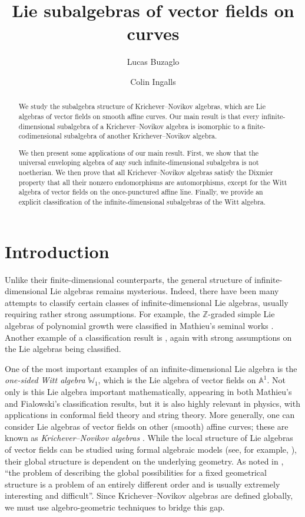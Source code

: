 \documentclass[12pt]{amsart}
\title{Lie subalgebras of vector fields on curves}
\author{Lucas Buzaglo}
\author{Colin Ingalls}
\theoremstyle{plain}
\theoremstyle{definition}
\numberwithin{equation}{section}
\def\ZZ{\mathbb{Z}}
\def\Aa{\mathbb{A}}
\def\WW{\mathbb{W}}
\begin{document}
\begin{abstract}
    We study the subalgebra structure of Krichever--Novikov algebras, which are Lie algebras of vector fields on smooth affine curves. Our main result is that every infinite-dimensional subalgebra of a Krichever--Novikov algebra is isomorphic to a finite-codimensional subalgebra of another Krichever--Novikov algebra.
    
    We then present some applications of our main result. First, we show that the universal enveloping algebra of any such infinite-dimensional subalgebra is not noetherian. We then prove that all Krichever--Novikov algebras satisfy the Dixmier property that all their nonzero endomorphisms are automorphisms, except for the Witt algebra of vector fields on the once-punctured affine line. Finally, we provide an explicit classification of the infinite-dimensional subalgebras of the Witt algebra.
\end{abstract}

\maketitle

\section{Introduction}

Unlike their finite-dimensional counterparts, the general structure of infinite-dimensional Lie algebras remains mysterious. Indeed, there have been many attempts to classify certain classes of infinite-dimensional Lie algebras, usually requiring rather strong assumptions. For example, the $\ZZ$-graded simple Lie algebras of polynomial growth were classified in Mathieu's seminal works \cite{Mathieu1, Mathieu2, Mathieu3}. Another example of a classification result is \cite{Fialowski}, again with strong assumptions on the Lie algebras being classified.

One of the most important examples of an infinite-dimensional Lie algebra is the \emph{one-sided Witt algebra} $\WW_1$, which is the Lie algebra of vector fields on $\Aa^1$. Not only is this Lie algebra important mathematically, appearing in both Mathieu's and Fialowski's classification results, but it is also highly relevant in physics, with applications in conformal field theory and string theory. More generally, one can consider Lie algebras of vector fields on other (smooth) affine curves; these are known as \emph{Krichever--Novikov algebras} \cite{KricheverNovikov, Schlichenmaier}. While the local structure of Lie algebras of vector fields can be studied using formal algebraic models (see, for example, \cite{GuilleminSternberg}), their global structure is dependent on the underlying geometry. As noted in \cite{GuilleminSternberg}, ``the problem of describing the global possibilities for a fixed geometrical structure is a problem of an entirely different order and is usually extremely interesting and difficult''. Since Krichever--Novikov algebras are defined globally, we must use algebro-geometric techniques to bridge this gap.
\end{document}
